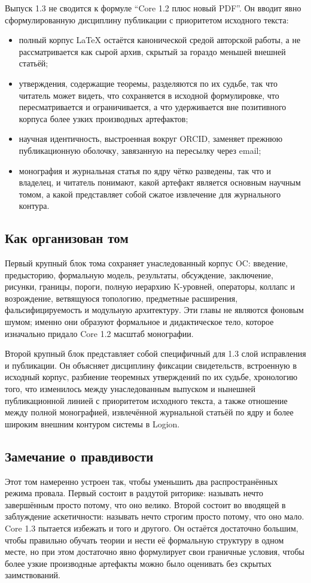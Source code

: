 Выпуск 1.3 не сводится к формуле ``Core 1.2 плюс новый PDF''.
Он вводит явно сформулированную дисциплину публикации с приоритетом исходного текста:

\begin{itemize}
\item полный корпус LaTeX остаётся канонической средой авторской работы, а не рассматривается как сырой архив, скрытый за гораздо меньшей внешней статьёй;
\item утверждения, содержащие теоремы, разделяются по их судьбе, так что читатель может видеть, что сохраняется в исходной формулировке, что пересматривается и ограничивается, а что удерживается вне позитивного корпуса более узких производных артефактов;
\item научная идентичность, выстроенная вокруг ORCID, заменяет прежнюю публикационную оболочку, завязанную на пересылку через email;
\item монография и журнальная статья по ядру чётко разведены, так что и владелец, и читатель понимают, какой артефакт является основным научным томом, а какой представляет собой сжатое извлечение для журнального контура.
\end{itemize}

\subsection{Как организован том}

Первый крупный блок тома сохраняет унаследованный корпус OC: введение, предысторию, формальную модель, результаты, обсуждение, заключение, рисунки, границы, пороги, полную иерархию K-уровней, операторы, коллапс и возрождение, ветвящуюся топологию, предметные расширения, фальсифицируемость и модульную архитектуру. Эти главы не являются фоновым шумом; именно они образуют формальное и дидактическое тело, которое изначально придало Core 1.2 масштаб монографии.

Второй крупный блок представляет собой специфичный для 1.3 слой исправления и публикации.
Он объясняет дисциплину фиксации свидетельств, встроенную в исходный корпус, разбиение теоремных утверждений по их судьбе, хронологию того, что изменилось между унаследованным выпуском и нынешней публикационной линией с приоритетом исходного текста, а также отношение между полной монографией, извлечённой журнальной статьёй по ядру и более широким внешним контуром системы в Logion.

\subsection{Замечание о правдивости}

Этот том намеренно устроен так, чтобы уменьшить два распространённых режима провала.
Первый состоит в раздутой риторике: называть нечто завершённым просто потому, что оно велико.
Второй состоит во вводящей в заблуждение аскетичности: называть нечто строгим просто потому, что оно мало.
Core 1.3 пытается избежать и того и другого.
Он остаётся достаточно большим, чтобы правильно обучать теории и нести её формальную структуру в одном месте, но при этом достаточно явно формулирует свои граничные условия, чтобы более узкие производные артефакты можно было оценивать без скрытых заимствований.

\clearpage
